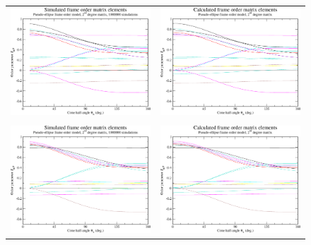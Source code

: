 \begin{figure}
\centering
  \begin{tabular}{@{}cc@{}}
    \includegraphics[width=.5\textwidth]{images/frame_order_matrix/Sijkl_pseudo-ellipse_in_frame_theta_x_ens1000000.eps} &
    \includegraphics[width=.5\textwidth]{images/frame_order_matrix/Sijkl_pseudo-ellipse_in_frame_theta_x_calc.eps} \\
    \\[-5pt]
    \includegraphics[width=.5\textwidth]{images/frame_order_matrix/Sijkl_pseudo-ellipse_in_frame_theta_y_ens1000000.eps} &
    \includegraphics[width=.5\textwidth]{images/frame_order_matrix/Sijkl_pseudo-ellipse_in_frame_theta_y_calc.eps} \\

\end{tabular}
\end{figure}

